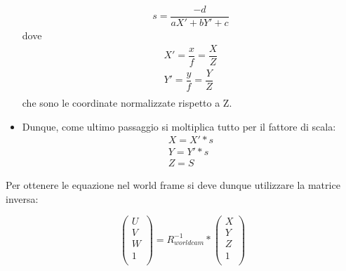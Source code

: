 \begin{itemize}
		\begin{equation}
		\begin{split}
		s = \dfrac{-d}{aX'+bY'+c}	
		\end{split}
		\end{equation}
	dove
		\begin{equation}
		\begin{split}
		X'=\dfrac{x}{f}=\dfrac{X}{Z}\\
		Y'=\dfrac{y}{f}=\dfrac{Y}{Z} \\
		\end{split}
		\end{equation}
	che sono le coordinate normalizzate rispetto a Z.
	\item \textbf{}
	Dunque, come ultimo passaggio si moltiplica tutto per il fattore di scala:
		\begin{equation}
		\begin{split}
		X=X'*s\\
		Y=Y'*s\\
		Z=S
		\end{split}
		\end{equation}
	
\end{itemize}

Per ottenere le equazione nel world frame si deve dunque utilizzare la matrice inversa:

$$
\begin{pmatrix}
U  \\
V  \\
W  \\
1  \\
\end{pmatrix}
=R_{worldcam}^{-1}*
\begin{pmatrix}
X  \\
Y  \\
Z  \\
1  \\
\end{pmatrix}
$$
